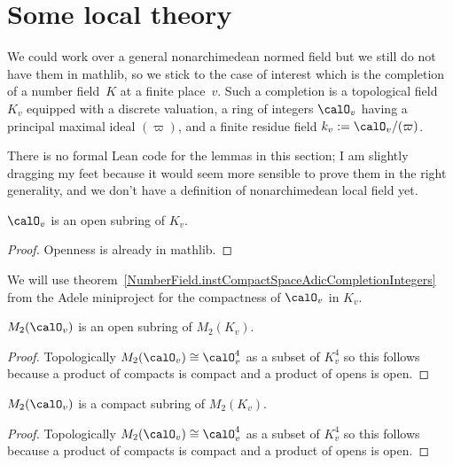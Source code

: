 \section{Some local theory}

We could work over a general nonarchimedean normed field but we still do not have them
in mathlib, so we stick to the case of interest which is the completion of a number
field~$K$ at a finite place~$v$. Such a completion is a topological field~$K_v$
equipped with a discrete valuation, a ring of integers $\calO_v$ having a principal
maximal ideal $(\varpi)$, and a finite residue field $k_v:=\calO_v/(\varpi)$.

There is no formal Lean code for the lemmas in this section; I am slightly dragging my
feet because it would seem more sensible to prove them in the right generality,
and we don't have a definition of nonarchimedean local field yet.

\begin{lemma}
  \label{NumberField.isOpenAdicCompletionIntegers}
  \leanok
  $\calO_v$ is an open subring of $K_v$.
\end{lemma}
\begin{proof}
  \leanok
  Openness is already in mathlib.
\end{proof}

We will use theorem~\ref{NumberField.instCompactSpaceAdicCompletionIntegers} from the Adele
miniproject for the compactness of $\calO_v$ in $K_v$.

\begin{lemma} $M_2(\calO_v)$ is an open subring of $M_2(K_v)$.
  \label{M2.localFullLevel.isOpen}
  \leanok
\end{lemma}
\begin{proof}
  \leanok
  Topologically $M_2(\calO_v)\cong \calO_v^4$ as a subset of $K_v^4$ so this
  follows because a product of compacts is compact and a product of opens is open.
\end{proof}

\begin{lemma} $M_2(\calO_v)$ is a compact subring of $M_2(K_v)$.
  \label{M2.localFullLevel.isCompact}
  \leanok
\end{lemma}
\begin{proof}
  \leanok
  Topologically $M_2(\calO_v)\cong \calO_v^4$ as a subset of $K_v^4$ so this
  follows because a product of compacts is compact and a product of opens is open.
\end{proof}

